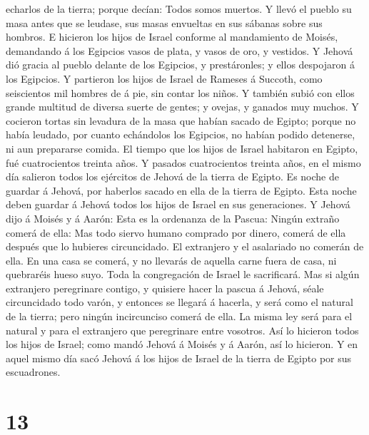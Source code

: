 echarlos de la tierra; porque decían: Todos somos muertos.
 Y llevó el pueblo su masa antes que se leudase, sus
masas envueltas en sus sábanas sobre sus hombros.  E
hicieron los hijos de Israel conforme al mandamiento de Moisés,
demandando á los Egipcios vasos de plata, y vasos de oro, y vestidos.
 Y Jehová dió gracia al pueblo delante de los Egipcios, y
prestáronles; y ellos despojaron á los Egipcios.  Y
partieron los hijos de Israel de Rameses á Succoth, como seiscientos mil
hombres de á pie, sin contar los niños.  Y también subió
con ellos grande multitud de diversa suerte de gentes; y ovejas, y
ganados muy muchos.  Y cocieron tortas sin levadura de la
masa que habían sacado de Egipto; porque no había leudado, por cuanto
echándolos los Egipcios, no habían podido detenerse, ni aun prepararse
comida.  El tiempo que los hijos de Israel habitaron en
Egipto, fué cuatrocientos treinta años.  Y pasados
cuatrocientos treinta años, en el mismo día salieron todos los ejércitos
de Jehová de la tierra de Egipto.  Es noche de guardar á
Jehová, por haberlos sacado en ella de la tierra de Egipto. Esta noche
deben guardar á Jehová todos los hijos de Israel en sus generaciones.
 Y Jehová dijo á Moisés y á Aarón: Esta es la ordenanza
de la Pascua: Ningún extraño comerá de ella:  Mas todo
siervo humano comprado por dinero, comerá de ella después que lo
hubieres circuncidado.  El extranjero y el asalariado no
comerán de ella.  En una casa se comerá, y no llevarás de
aquella carne fuera de casa, ni quebraréis hueso suyo. 
Toda la congregación de Israel le sacrificará.  Mas si
algún extranjero peregrinare contigo, y quisiere hacer la pascua á
Jehová, séale circuncidado todo varón, y entonces se llegará á hacerla,
y será como el natural de la tierra; pero ningún incircunciso comerá de
ella.  La misma ley será para el natural y para el
extranjero que peregrinare entre vosotros.  Así lo
hicieron todos los hijos de Israel; como mandó Jehová á Moisés y á
Aarón, así lo hicieron.  Y en aquel mismo día sacó Jehová
á los hijos de Israel de la tierra de Egipto por sus escuadrones.

\hypertarget{section-12}{%
\section{13}\label{section-12}}


